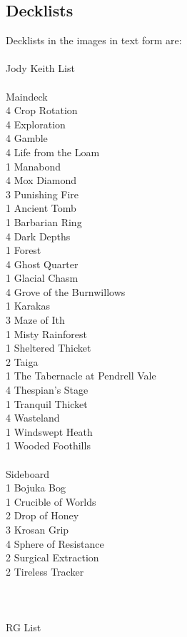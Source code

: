 \documentclass{report}
\begin{document}
\subsection{Decklists}
Decklists in the images in text form are:\\\\
Jody Keith List\\\\
Maindeck\\
4 Crop Rotation\\
4 Exploration\\
4 Gamble\\
4 Life from the Loam\\
1 Manabond\\
4 Mox Diamond\\
3 Punishing Fire\\
1 Ancient Tomb\\
1 Barbarian Ring\\
4 Dark Depths\\
1 Forest\\
4 Ghost Quarter\\
1 Glacial Chasm\\
4 Grove of the Burnwillows\\
1 Karakas\\
3 Maze of Ith\\
1 Misty Rainforest\\
1 Sheltered Thicket\\
2 Taiga\\
1 The Tabernacle at Pendrell Vale\\
4 Thespian's Stage\\
1 Tranquil Thicket\\
4 Wasteland\\
1 Windswept Heath\\
1 Wooded Foothills\\\\
Sideboard\\
1 Bojuka Bog\\
1 Crucible of Worlds\\
2 Drop of Honey\\
3 Krosan Grip\\
4 Sphere of Resistance\\
2 Surgical Extraction\\
2 Tireless Tracker\\\\\\\\
RG List\\\\
\end{document}
